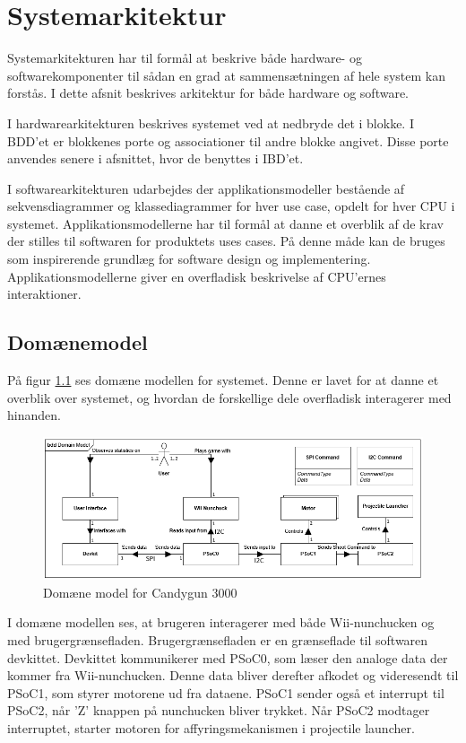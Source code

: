 \chapter{Systemarkitektur}
Systemarkitekturen har til formål at beskrive både hardware- og softwarekomponenter til sådan en grad at sammensætningen af hele system kan forstås. I dette afsnit beskrives arkitektur for både hardware og software.

I hardwarearkitekturen beskrives systemet ved at nedbryde det i blokke. I BDD'et er blokkenes porte og associationer til andre blokke angivet. Disse porte anvendes senere i afsnittet, hvor de benyttes i IBD'et.

I softwarearkitekturen udarbejdes der applikationsmodeller bestående af sekvensdiagrammer og klassediagrammer for hver use case, opdelt for hver CPU i systemet. Applikationsmodellerne har til formål at danne et overblik af de krav der stilles til softwaren for produktets uses cases. På denne måde kan de bruges som inspirerende grundlæg for software design og implementering. Applikationsmodellerne giver en overfladisk beskrivelse af CPU'ernes interaktioner.

\section{Domænemodel}
På figur \ref{fig:DomainModel} ses domæne modellen for systemet. Denne er lavet for at danne et overblik over systemet, og hvordan de forskellige dele overfladisk interagerer med hinanden. 

\begin{figure}[H]
	\centering
	\includegraphics[width=\textwidth]{Systemarkitektur/images/DomainModel}
	\caption{Domæne model for Candygun 3000}
	\label{fig:DomainModel}
\end{figure}

I domæne modellen ses, at brugeren interagerer med både Wii-nunchucken og med brugergrænsefladen. Brugergrænsefladen er en grænseflade til softwaren devkittet. Devkittet kommunikerer med PSoC0, som læser den analoge data der kommer fra Wii-nunchucken. Denne data bliver derefter afkodet og videresendt til PSoC1, som styrer motorene ud fra dataene. PSoC1 sender også et interrupt til PSoC2, når 'Z' knappen på nunchucken bliver trykket. Når PSoC2 modtager interruptet, starter motoren for affyringsmekanismen i projectile launcher.


